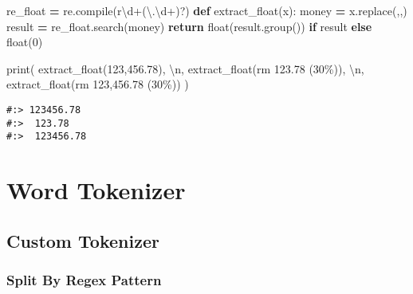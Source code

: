 \documentclass[
]{book}
\newenvironment{Shaded}{\begin{snugshade}}{\end{snugshade}}
\newcommand{\BuiltInTok}[1]{#1}
\newcommand{\CharTok}[1]{\textcolor[rgb]{0.5,0.5,0.5}{#1}}
\newcommand{\ControlFlowTok}[1]{\textcolor[rgb]{0.27,0.27,0.27}{\textbf{#1}}}
\newcommand{\DecValTok}[1]{\textcolor[rgb]{0.06,0.06,0.06}{#1}}
\newcommand{\KeywordTok}[1]{\textcolor[rgb]{0.27,0.27,0.27}{\textbf{#1}}}
\newcommand{\NormalTok}[1]{#1}
\newcommand{\OperatorTok}[1]{\textcolor[rgb]{0.43,0.43,0.43}{\textbf{#1}}}
\newcommand{\StringTok}[1]{\textcolor[rgb]{0.5,0.5,0.5}{#1}}
\newcommand{\VerbatimStringTok}[1]{\textcolor[rgb]{0.5,0.5,0.5}{#1}}
\begin{document}
\begin{Shaded}
\begin{Highlighting}[]
\NormalTok{re\_float }\OperatorTok{=}\NormalTok{ re.}\BuiltInTok{compile}\NormalTok{(}\VerbatimStringTok{r\textquotesingle{}\textbackslash{}d+(\textbackslash{}.\textbackslash{}d+)?\textquotesingle{}}\NormalTok{)}
\KeywordTok{def}\NormalTok{ extract\_float(x):}
\NormalTok{    money }\OperatorTok{=}\NormalTok{ x.replace(}\StringTok{\textquotesingle{},\textquotesingle{}}\NormalTok{,}\StringTok{\textquotesingle{}\textquotesingle{}}\NormalTok{)}
\NormalTok{    result }\OperatorTok{=}\NormalTok{ re\_float.search(money)}
    \ControlFlowTok{return} \BuiltInTok{float}\NormalTok{(result.group()) }\ControlFlowTok{if}\NormalTok{ result }\ControlFlowTok{else} \BuiltInTok{float}\NormalTok{(}\DecValTok{0}\NormalTok{)}

\BuiltInTok{print}\NormalTok{( extract\_float(}\StringTok{\textquotesingle{}123,456.78\textquotesingle{}}\NormalTok{), }\StringTok{\textquotesingle{}}\CharTok{\textbackslash{}n}\StringTok{\textquotesingle{}}\NormalTok{,}
\NormalTok{       extract\_float(}\StringTok{\textquotesingle{}rm 123.78 (30\%)\textquotesingle{}}\NormalTok{), }\StringTok{\textquotesingle{}}\CharTok{\textbackslash{}n}\StringTok{\textquotesingle{}}\NormalTok{,}
\NormalTok{       extract\_float(}\StringTok{\textquotesingle{}rm 123,456.78 (30\%)\textquotesingle{}}\NormalTok{) )}
\end{Highlighting}
\end{Shaded}

\begin{verbatim}
#:> 123456.78 
#:>  123.78 
#:>  123456.78
\end{verbatim}

\hypertarget{word-tokenizer}{%
\section{Word Tokenizer}\label{word-tokenizer}}

\hypertarget{custom-tokenizer}{%
\subsection{Custom Tokenizer}\label{custom-tokenizer}}

\hypertarget{split-by-regex-pattern}{%
\subsubsection{Split By Regex Pattern}\label{split-by-regex-pattern}}
\end{document}
